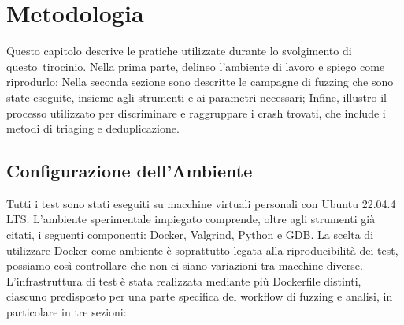 \chapter{Metodologia}

Questo capitolo descrive le pratiche utilizzate durante lo svolgimento di questo tirocinio. Nella prima parte, delineo l'ambiente di lavoro e spiego come riprodurlo; Nella seconda sezione sono descritte le campagne di fuzzing che sono state eseguite, insieme agli strumenti e ai parametri necessari; Infine, illustro il processo utilizzato per discriminare e raggruppare i crash trovati, che include i metodi di triaging e deduplicazione.

\section{Configurazione dell'Ambiente}

Tutti i test sono stati eseguiti su macchine virtuali personali con Ubuntu 22.04.4 LTS. L’ambiente sperimentale impiegato comprende, oltre agli strumenti già citati, i seguenti componenti: Docker, Valgrind, Python e GDB. La scelta di utilizzare Docker come ambiente è soprattutto legata alla riproducibilità dei test, possiamo così controllare che non ci siano variazioni tra macchine diverse. L’infrastruttura di test è stata realizzata mediante più Dockerfile distinti, ciascuno predisposto per una parte specifica del workflow di fuzzing e analisi, in particolare in tre sezioni:

